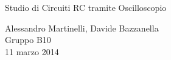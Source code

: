 \begin{center}

     	{\huge Studio di Circuiti RC tramite Oscilloscopio }

     	\vspace{0.2cm}
	\vspace{0.3cm}

      	{\large Alessandro Martinelli, Davide Bazzanella} \\
		{\large Gruppo B10} \\
	
	\vspace{0.1cm}
      	{\large 11 marzo 2014}

\end{center}
